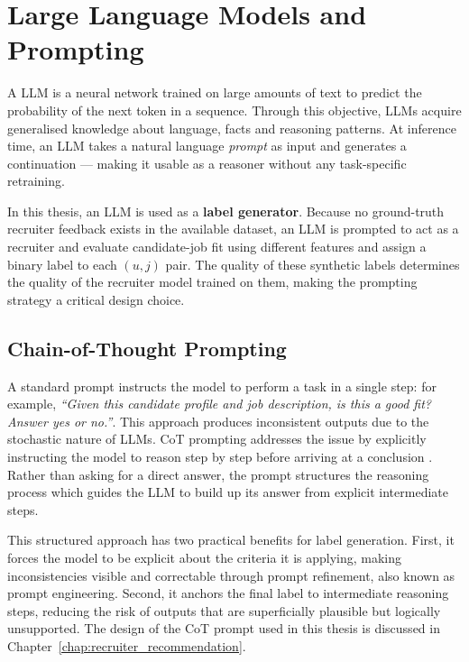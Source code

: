 \section{Large Language Models and Prompting}
\label{sec:prelim_llm}
 
A \gls{LLM} is a neural network trained on large amounts of text to predict the probability of the next token in a sequence. Through this objective, \glspl{LLM} acquire generalised knowledge about language, facts and reasoning patterns. At inference time, an \gls{LLM} takes a natural language \emph{prompt} as input and generates a continuation --- making it usable as a reasoner without any task-specific retraining.
 
In this thesis, an \gls{LLM} is used as a \textbf{label generator}. Because no ground-truth recruiter feedback exists in the available dataset, an \gls{LLM} is prompted to act as a recruiter and evaluate candidate-job fit using different features and assign a binary label to each $(u,j)$ pair. The quality of these synthetic labels determines the quality of the recruiter model trained on them, making the prompting strategy a critical design choice.
\subsection{Chain-of-Thought Prompting}
\label{sec:prelim_cot}
A standard prompt instructs the model to perform a task in a single step: for example, \emph{``Given this candidate profile and job description, is this a good fit? Answer yes or no.''}. This approach produces inconsistent outputs due to the stochastic nature of \glspl{LLM}. \gls{CoT} prompting addresses the issue by explicitly instructing the model to reason step by step before arriving at a conclusion \cite{wei2023chainofthoughtpromptingelicitsreasoning}. Rather than asking for a direct answer, the prompt structures the reasoning process which guides the \gls{LLM} to build up its answer from explicit intermediate steps.
 
This structured approach has two practical benefits for label generation. First, it forces the model to be explicit about the criteria it is applying, making inconsistencies visible and correctable through prompt refinement, also known as prompt engineering. Second, it anchors the final label to intermediate reasoning steps, reducing the risk of outputs that are superficially plausible but logically unsupported. The design of the \gls{CoT} prompt used in this thesis is discussed in Chapter~\ref{chap:recruiter_recommendation}.


